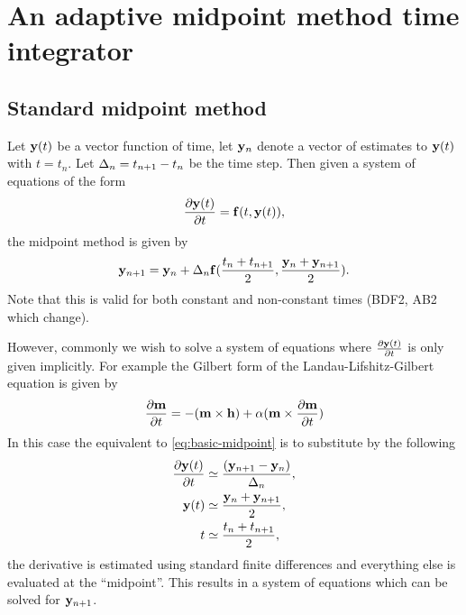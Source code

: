\newcommand{\yhf}{\hat{\yv}_n}
\newcommand{\dfdy}{F}


\section{An adaptive midpoint method time integrator}







\subsection{Standard midpoint method}

Let $\mathbf{y}(t)$ be a vector function of time, let $\mathbf{y}_n$ denote a vector of estimates to $\mathbf{y}(t)$ with $t = t_n$.
Let $\Delta_{n} = t_{n+1} - t_n$ be the time step.
Then given a system of equations of the form
\begin{equation}
  \frac{\partial \mathbf{y}(t)}{\partial t} = {\mathbf{f}}(t, \mathbf{y}(t)),
\end{equation}
the midpoint method is given by
\begin{equation}
  \mathbf{y}_{n+1} = \mathbf{y}_n + \Delta_{n} {\mathbf{f}}(\frac{t_n + t_{n+1}}{2}, \frac{\mathbf{y}_n + \mathbf{y}_{n+1}}{2}).
  \label{eq:basic-midpoint}
\end{equation}
Note that this is valid for both constant and non-constant times (\cf BDF2, AB2 which change).

However, commonly we wish to solve a system of equations where $ \frac{\partial \mathbf{y}(t)}{\partial t}$ is only given implicitly.
For example the Gilbert form of the Landau-Lifshitz-Gilbert equation is given by
\begin{equation}
  \frac{\partial \mathbf{m}}{\partial t} = -(\mathbf{m} \times \mathbf{h}) + \alpha (\mathbf{m} \times \frac{\partial \mathbf{m}}{\partial t})
\end{equation}
 In this case the equivalent to \eqref{eq:basic-midpoint} is to substitute by the following
\begin{align}
  \frac{\partial \mathbf{y}(t)}{\partial t} & \simeq \frac{(\mathbf{y}_{n+1} - \mathbf{y}_n)}{\Delta_{n}}, \\
  \mathbf{y}(t) & \simeq \frac{\mathbf{y}_n + \mathbf{y}_{n+1}}{2}, \notag \\
  t & \simeq \frac{t_n + t_{n+1}}{2}, \notag
\end{align}
\ie the derivative is estimated using standard finite differences and everything else is evaluated at the ``midpoint''.
This results in a system of equations which can be solved for $\mathbf{y}_{n+1}$.

